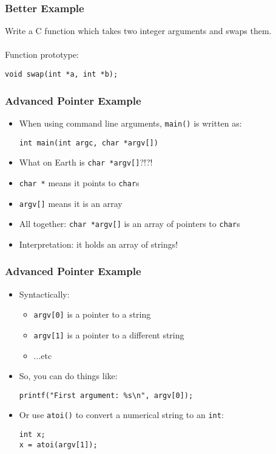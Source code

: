 \documentclass[14pt]{beamer}
\begin{document}
\begin{frame}[fragile]
\frametitle{Better Example}
Write a C function which takes two integer arguments and swaps them.
\\~\\
Function prototype:
\begin{lstlisting}[style=CStyle]
void swap(int *a, int *b);
\end{lstlisting}
\end{frame}

\begin{frame}[fragile]
\frametitle{Advanced Pointer Example}
\begin{itemize}
\item When using command line arguments, \texttt{main()} is written as:
\begin{lstlisting}[style=CStyle]
int main(int argc, char *argv[])
\end{lstlisting}
\item What on Earth is \texttt{char *argv[]}?!?!
\pause
\item \texttt{char *} means it points to \texttt{char}s
\pause
\item \texttt{argv[]} means it is an array
\pause
\item All together: \texttt{char *argv[]} is an array of pointers to \texttt{char}s
\item Interpretation: it holds an array of strings!
\end{itemize}
\end{frame}

\begin{frame}[fragile]
\frametitle{Advanced Pointer Example}
\begin{itemize}
\item Syntactically:
	\begin{itemize}
		\item \texttt{argv[0]} is a pointer to a string
		\item \texttt{argv[1]} is a pointer to a different string
		\item ...etc
	\end{itemize}
\item So, you can do things like:
\begin{lstlisting}[style=CStyle]
printf("First argument: %s\n", argv[0]);
\end{lstlisting}
\item Or use \texttt{atoi()} to convert a numerical string to an \texttt{int}:
\begin{lstlisting}[style=CStyle]
int x;
x = atoi(argv[1]);
\end{lstlisting}
\end{itemize}
\end{frame}
\end{document}
